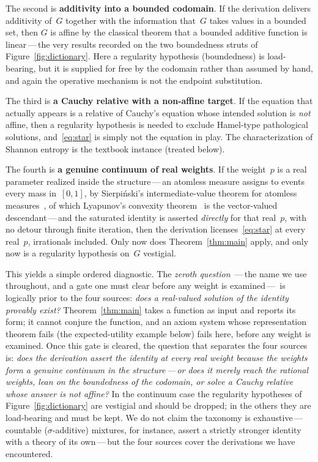 \documentclass{article}
\theoremstyle{plain}
\theoremstyle{definition}
\begin{document}
The second is \textbf{additivity into a bounded codomain}. If the
derivation delivers additivity of~$G$ together with the information
that~$G$ takes values in a bounded set, then $G$ is affine by the
classical theorem that a bounded additive function is linear\,---\,the
very results recorded on the two boundedness struts of
Figure~\ref{fig:dictionary}. Here a regularity hypothesis (boundedness)
is load-bearing, but it is supplied for free by the codomain rather
than assumed by hand, and again the operative mechanism is not the
endpoint substitution.

The third is \textbf{a Cauchy relative with a non-affine target}. If
the equation that actually appears is a relative of Cauchy's equation
whose intended solution is \emph{not} affine, then a regularity
hypothesis is needed to exclude Hamel-type pathological solutions,
and~\eqref{eq:star} is simply not the equation in play. The
characterization of Shannon entropy is the textbook instance
(treated below).

The fourth is \textbf{a genuine continuum of real weights}. If the
weight~$p$ is a real parameter realized inside the
structure\,---\,an atomless measure assigns to events every mass
in~$[0,1]$, by Sierpi\'nski's intermediate-value theorem for atomless
measures~\cite{Sierpinski1922}, of which Lyapunov's convexity
theorem~\cite{Lyapunov1940} is the vector-valued
descendant\,---\,and the saturated
identity is asserted \emph{directly} for that real~$p$, with no
detour through finite iteration, then the derivation
licenses~\eqref{eq:star} at every real~$p$, irrationals included.
Only now does Theorem~\ref{thm:main} apply, and only now is a
regularity hypothesis on~$G$ vestigial.

This yields a simple ordered diagnostic. The \emph{zeroth question} \,---\,the name we use throughout, and a gate one must clear before any weight is examined\,---\, is
logically prior to the four sources: \emph{does a real-valued solution
of the identity provably exist?} Theorem~\ref{thm:main} takes a
function as input and reports its form; it cannot conjure the
function, and an axiom system whose representation theorem fails (the
expected-utility example below) fails here, before any weight is
examined. Once this gate is cleared, the question that separates the
four sources is: \emph{does the derivation assert the identity at
every real weight because the weights form a genuine continuum in the
structure\,---\,or does it merely reach the rational weights, lean on
the boundedness of the codomain, or solve a Cauchy relative whose
answer is not affine?} In the continuum case the regularity hypotheses
of Figure~\ref{fig:dictionary} are vestigial and should be dropped; in
the others they are load-bearing and must be kept. We do not claim the
taxonomy is exhaustive\,---\,countable ($\sigma$-additive) mixtures,
for instance, assert a strictly stronger identity with a theory of its
own\,---\,but the four sources cover the derivations we have
encountered.
\end{document}
